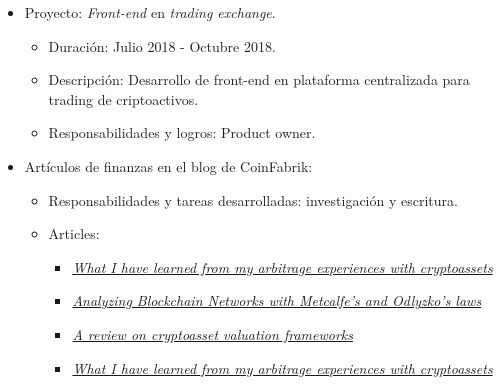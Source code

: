 \documentclass[11pt,a4paper,sans]{moderncv}        %
\begin{document}
{\begin{itemize}
\begin{itemize}
	\item Duración: Agosto 2018 - Octubre 2018.
	\item Descripción: Descentralización de Taringa!, la red social latinoamericana con ~500k usuarios activos diarios.
	\item esponsabilidades y tareas desarrolladas: Diseño de la descentralización general de la plataforma,
	incluyendo arquitectura, dinámica de token, incentivos y economía.
	\end{itemize}
\item Proyecto: \textit{Front-end} en \textit{trading exchange}.
	\begin{itemize}%
	\item Duración: Julio 2018 - Octubre 2018.
	\item Descripción: Desarrollo de front-end en plataforma centralizada para trading de criptoactivos.
	\item Responsabilidades y logros: Product owner.
	\end{itemize}
\item Artículos de finanzas en el blog de CoinFabrik:
	\begin{itemize}%
	\item Responsabilidades y tareas desarrolladas: investigación y escritura.
	\item Articles:
		\begin{itemize}
		\item \href{https://blog.coinfabrik.com/what-i-have-learned-from-my-arbitrage-experiences-with-cryptoassets/}{\textit{What I have learned from my arbitrage experiences with cryptoassets}}
		\item \href{https://blog.coinfabrik.com/analyzing-blockchain-networks-with-metcafes-and-odlyzkos-laws/}{\textit{Analyzing Blockchain Networks with Metcalfe’s and Odlyzko’s laws}}
		\item \href{https://blog.coinfabrik.com/a-review-on-cryptoasset-valuation-frameworks/}{\textit{A review on cryptoasset valuation frameworks}}
		\item \href{https://blog.coinfabrik.com/what-i-have-learned-from-my-arbitrage-experiences-with-cryptoassets/}{\textit{What I have learned from my arbitrage experiences with cryptoassets}}
		\end{itemize}	
	\end{itemize}
\end{itemize}
}
\end{document}
